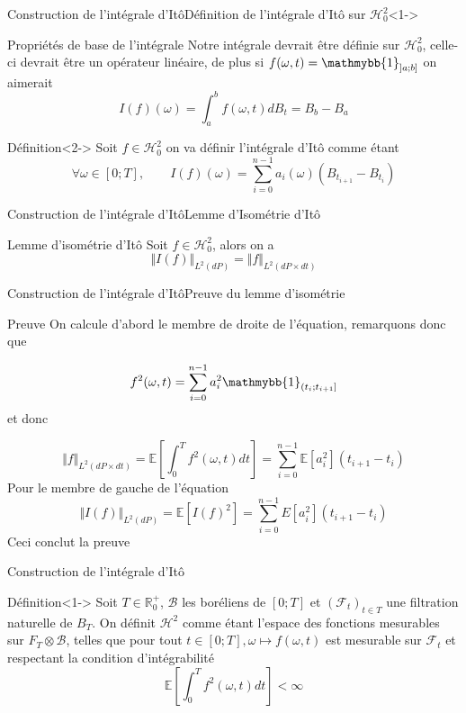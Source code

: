 \documentclass{beamer}
\newcommand{\1}{\mathmybb{1}}
\begin{document}
    \begin{frame}{Construction de l'intégrale d'Itô}{Définition de l'intégrale d'Itô sur $\mathcal{H}^2_0$}<1->
      \begin{block}{Propriétés de base de l'intégrale}
        Notre intégrale devrait être définie sur $\mathcal{H}^{2}_{0}$, celle-ci devrait être un opérateur linéaire, de plus
     si $ f(\omega, t) = \1_{\left] a; b \right]} $ on aimerait
     \[
       I(f)(\omega) = \int_{a}^{b}f(\omega, t) dB_{t} = B_{b} - B_{a}
     \]
   \end{block}
     \begin{block}{Définition}<2->
       Soit $ f \in \mathcal{H}^{2}_{0} $ on va définir l'intégrale d'Itô comme étant
       \[
         \forall \omega \in [0; T], \qquad I(f)(\omega) = \sum_{i=0}^{n-1} a_{i}(\omega)\left( B_{t_{i+1}} - B_{t_{i}} \right)
       \]
     \end{block}
   \end{frame}
   \begin{frame}{Construction de l'intégrale d'Itô}{Lemme d'Isométrie d'Itô}
     \begin{block}{Lemme d'isométrie d'Itô}
       Soit $f \in \mathcal{H}_{0}^{2}$, alors on a
       \[
         \Vert I(f) \Vert_{L^{2}(dP)} = \Vert f \Vert_{L^{2}(dP \times dt)}
       \]
     \end{block}
     \end{frame}
    \begin{frame}{Construction de l'intégrale d'Itô}{Preuve du lemme d'isométrie}
     \begin{block}{Preuve}
       On calcule d'abord le membre de droite de l'équation, remarquons donc que

       \[
       f ^{2}(\omega, t) = \sum_{i=0}^{n-1}a^{2}_{i} \1 _{\left( t_{i} ; t_{i+1} \right]}
     \]
     et donc

     \[
      \Vert f \Vert _{L^{2}(dP \times dt)} =\mathbb{E} \left[ \int_{0}^{T} f^{2} (\omega, t) dt \right] = \sum_{i=0}^{n-1} \mathbb{E}\left[  a^{2}_{i}\right] (t_{i+1} - t_i)
     \]
     Pour le membre de gauche de l'équation
     \[
       \Vert I(f) \Vert _{L^{2}(dP)} = \mathbb{E}\left[ I(f)^{2} \right] = \sum_{i=0}^{n-1} E \left[a^{2}_{i}\right] (t_{i+1} - t_{i})
     \]
     Ceci conclut la preuve
       \end{block}
     \end{frame}
     \begin{frame}{Construction de l'intégrale d'Itô}
   \begin{block}{Définition}<1->
     Soit $T \in \mathbb{R}^{+}_{0}$, $\mathcal{B}$ les boréliens de $\left[0; T  \right]$ et $\left( \mathcal{F}_{t} \right)_{t\in T}$ une filtration naturelle de $B_{T}$.
     On définit $\mathcal{H}^{2}$ comme étant l'espace des fonctions mesurables sur $F_{T} \otimes \mathcal{B}$, telles que pour tout $ t \in \left[0; T  \right], \omega \mapsto f(\omega, t)$ est mesurable sur $\mathcal{F}_{t}$ et respectant la condition d'intégrabilité \\
     \[
       \mathbb{E}\left[\int_{0}^{T}f^{2}(\omega, t) dt \right] < \infty
     \]
   \end{block}

     \end{frame}
\end{document}
